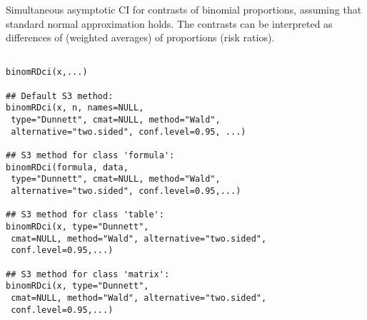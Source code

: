 \begin{Description}\relax
Simultaneous asymptotic CI for contrasts of binomial proportions,
assuming that standard normal approximation holds.
The contrasts can be interpreted as differences of (weighted averages)
of proportions (risk ratios).
\end{Description}
\begin{Usage}
\begin{verbatim}

binomRDci(x,...)

## Default S3 method:
binomRDci(x, n, names=NULL,
 type="Dunnett", cmat=NULL, method="Wald",
 alternative="two.sided", conf.level=0.95, ...)

## S3 method for class 'formula':
binomRDci(formula, data,
 type="Dunnett", cmat=NULL, method="Wald",
 alternative="two.sided", conf.level=0.95,...)

## S3 method for class 'table':
binomRDci(x, type="Dunnett",
 cmat=NULL, method="Wald", alternative="two.sided",
 conf.level=0.95,...)

## S3 method for class 'matrix':
binomRDci(x, type="Dunnett",
 cmat=NULL, method="Wald", alternative="two.sided",
 conf.level=0.95,...)

\end{verbatim}
\end{Usage}
